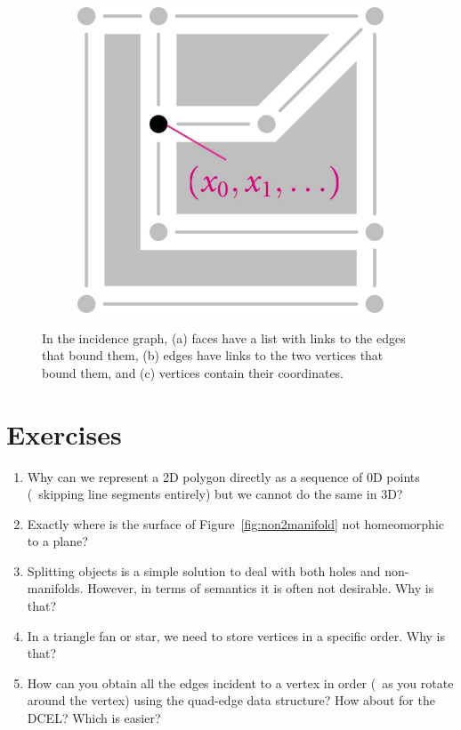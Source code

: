 \begin{figure}
\begin{subfigure}[b]{0.27\linewidth}
\caption{}%
\label{subfig:1-cell-boundary}
\end{subfigure}
\quad
\begin{subfigure}[b]{0.27\linewidth}
\includegraphics[width=\linewidth]{figs/0-cell-embedding}
\caption{}%
\label{subfig:0-cell-embedding}
\end{subfigure}
\caption{In the incidence graph, (a) faces have a list with links to the edges that bound them, (b) edges have links to the two vertices that bound them, and (c) vertices contain their coordinates.}%
\label{fig:incidencegraph}
\end{figure}

%
\section{Exercises}

\begin{enumerate}
	\item Why can we represent a 2D polygon directly as a sequence of 0D points (\ie\ skipping line segments entirely) but we cannot do the same in 3D\@?
	\item Exactly where is the surface of Figure~\ref{fig:non2manifold} not homeomorphic to a plane?
	\item Splitting objects is a simple solution to deal with both holes and non-manifolds. However, in terms of semantics it is often not desirable. Why is that?
	\item In a triangle fan or star, we need to store vertices in a specific order. Why is that?
	\item How can you obtain all the edges incident to a vertex in order (\ie\ as you rotate around the vertex) using the quad-edge data structure? How about for the DCEL\@? Which is easier?
\end{enumerate}



